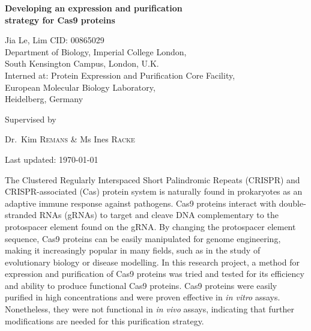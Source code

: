\documentclass[11pt]{article}
\renewenvironment{abstract}
 {\hspace{.8cm}
  {\bfseries\Large\abstractname}
  \list{}{
    \setlength{\leftmargin}{.95cm}%
    \setlength{\rightmargin}{\leftmargin}%
  }%
  \item\relax}
 {\endlist}
\begin{document}
\begin{titlepage}
	\centering
	\vspace*{\fill}
	{\huge\bfseries Developing an expression and purification \\ strategy for Cas9 proteins\par}
	\vspace{2cm}
	{\Large Jia Le, Lim {    }  CID: 00865029}
	\\ 	\vspace{0.5cm}
	{Department of Biology, Imperial College London, \\South Kensington Campus, London, U.K.} \\ \vspace{0.5cm}
	{Interned at: Protein Expression and Purification Core Facility, \\European Molecular Biology Laboratory,\\ Heidelberg, Germany} \\
	\vspace*{\fill}
	{\large Supervised by\par
	Dr.~Kim \textsc{Remans} \& Ms Ines \textsc{Racke} }
	\vfill
	{\large Last updated: \today\par}
\end{titlepage}

\vspace*{\fill}
\tableofcontents 
\vspace*{\fill} 
\thispagestyle{empty}

\doublespacing

\newpage
{}
\vspace*{\fill}
\begin{abstract}  
\doublespacing
The Clustered Regularly Interspaced Short Palindromic Repeats (CRISPR) and CRISPR-associated (Cas) protein system is naturally found in prokaryotes as an adaptive immune response against pathogens. Cas9 proteins interact with double-stranded RNAs (gRNAs) to target and cleave DNA complementary to the protospacer element found on the gRNA. By changing the protospacer element sequence, Cas9 proteins can be easily manipulated for genome engineering, making it increasingly popular in many fields, such as in the study of evolutionary biology or disease modelling. In this research project, a method for expression and purification of Cas9 proteins was tried and tested for its efficiency and ability to produce functional Cas9 proteins. Cas9 proteins were easily purified in high concentrations and were proven effective in \textit{in vitro} assays. Nonetheless, they were not functional in \textit{in vivo} assays, indicating that further modifications are needed for this purification strategy.

\end{abstract}
\vfill
\end{document}
